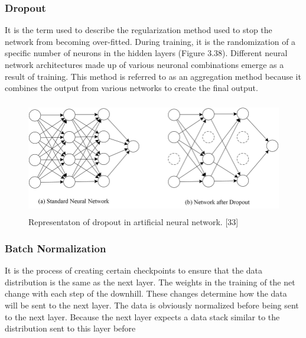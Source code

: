 \documentclass[12pt,twoside,a4]{mwbk}
\begin{document}
\subsubsection{Dropout}
It is the term used to describe the regularization method used to stop the network from becoming over-fitted. During training, it is the randomization of a specific number of neurons in the hidden layers (Figure 3.38). Different neural network architectures made up of various neuronal combinations emerge as a result of training. This method is referred to as an aggregation method because it combines the output from various networks to create the final output.
\begin{figure}[h]
    \centering
    \includegraphics[width=12.5cm, height=5.0cm]{Drop.png}
    \caption{Representaton of dropout in artificial neural network. [33]}
\end{figure}

\subsubsection{Batch Normalization}
It is the process of creating certain checkpoints to ensure that the data distribution is the same as the next layer. The weights in the training of the net change with each step of the downhill. These changes determine how the data will be sent to the next layer. The data is obviously normalized before being sent to the next layer. Because the next layer expects a data stack similar to the distribution sent to this layer before
\end{document}
